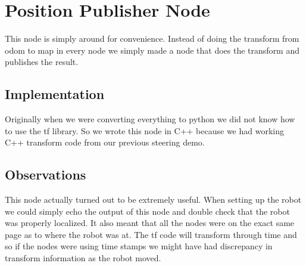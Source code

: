 \section{Position Publisher Node}

This node is simply around for convenience. Instead of doing the transform from odom to map in every node we simply made a node that does the transform and publishes the result.

\subsection{Implementation}

Originally when we were converting everything to python we did not know how to use the tf library.  So we wrote this node in C++ because we had working C++ transform code from our previous steering demo.

\subsection{Observations}

This node actually turned out to be extremely useful. When setting up the robot we could simply echo the output of this node and double check that the robot was properly localized. It also meant that all the nodes were on the exact same page as to where the robot was at. The tf code will transform through time and so if the nodes were using time stamps we might have had discrepancy in transform information as the robot moved.
